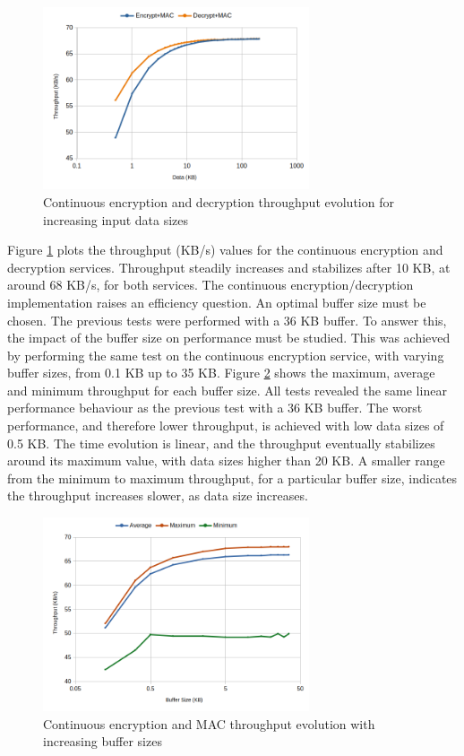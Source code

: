\begin{figure}[h!]
	\centering
	\includegraphics[width=0.7\textwidth]{./Images/services-tput.png}
	\caption{Continuous encryption and decryption throughput evolution for increasing input data sizes}
	\label{fig:performance:services-tput}
\end{figure}

Figure \ref{fig:performance:services-tput} plots the throughput (KB/s) values for the continuous encryption and decryption services. Throughput steadily increases and stabilizes after 10 KB, at around 68 KB/s, for both services.
The continuous encryption/decryption implementation raises an efficiency question. An optimal buffer size must be chosen. The previous tests were performed with a 36 KB buffer.
To answer this, the impact of the buffer size on performance must be studied.
This was achieved by performing the same test on the continuous encryption service, with varying buffer sizes, from 0.1 KB up to 35 KB. Figure \ref{fig:performance:buffer-tput} shows the maximum, average and minimum throughput for each buffer size.
All tests revealed the same linear performance behaviour as the previous test with a 36 KB buffer. The worst performance, and therefore lower throughput, is achieved with low data sizes of 0.5 KB. The time evolution is linear, and the throughput eventually stabilizes around its maximum value, with data sizes higher than 20 KB.
A smaller range from the minimum to maximum throughput, for a particular buffer size, indicates the throughput increases slower, as data size increases.

\begin{figure}[h!]
	\centering
	\includegraphics[width=0.7\textwidth]{./Images/buffer-tput.png}
	\caption{Continuous encryption and MAC throughput evolution with increasing buffer sizes}
	\label{fig:performance:buffer-tput}
\end{figure}

